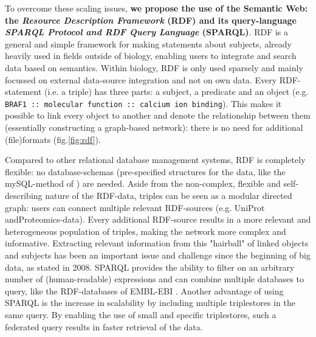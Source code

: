 \documentclass[twoside,fontsize=10pt]{article}
\begin{document}
\noindent
To overcome these scaling issues, \textbf{we propose the use of the Semantic Web: the \textit{Resource Description Framework} (RDF) and its query-language \textit{SPARQL Protocol and RDF Query Language} (SPARQL)}. RDF is a general and simple framework for making statements about subjects, already heavily used in fields outside of biology, enabling users to integrate and search data based on semantics. Within biology, RDF is only used sparsely and mainly focussed on external data-source integration and not on own data\cite{Belleau2008,Neumann2006,Sahoo2008}. Every RDF-statement (i.e. a triple) has three parts: a subject, a predicate and an object (e.g. \lstinline|BRAF1 :: molecular function :: calcium ion binding|). This makes it possible to link every object to another and denote the relationship between them (essentially constructing a graph-based network): there is no need for additional (file)formats (fig.\ref{fig:rdf}). 

Compared to other relational database management systems, RDF is completely flexible: no database-schemas (pre-specified structures for the data, like the mySQL-method of \citet{Low2013}) are needed. Aside from the non-complex, flexible and self-describing nature of the RDF-data, triples can be seen as a modular directed graph: users can connect multiple relevant RDF-sources (e.g. UniProt andProteomics-data). Every additional RDF-source results in a more relevant and heterogeneous population of triples, making the network more complex and informative. Extracting relevant information from this "hairball" of linked objects and subjects has been an important issue and challenge since the beginning of big data, as \citet{Pavlopoulos2008} stated in 2008. SPARQL provides the ability to filter on an arbitrary number of (human-readable) expressions and can combine multiple databases to query, like the RDF-databases of EMBL-EBI \citep{Jupp2014}. Another advantage of using SPARQL is the increase in scalability by including multiple triplestores in the same query. By enabling the use of small and specific triplestores, such a federated query results in faster retrieval of the data.
\end{document}
